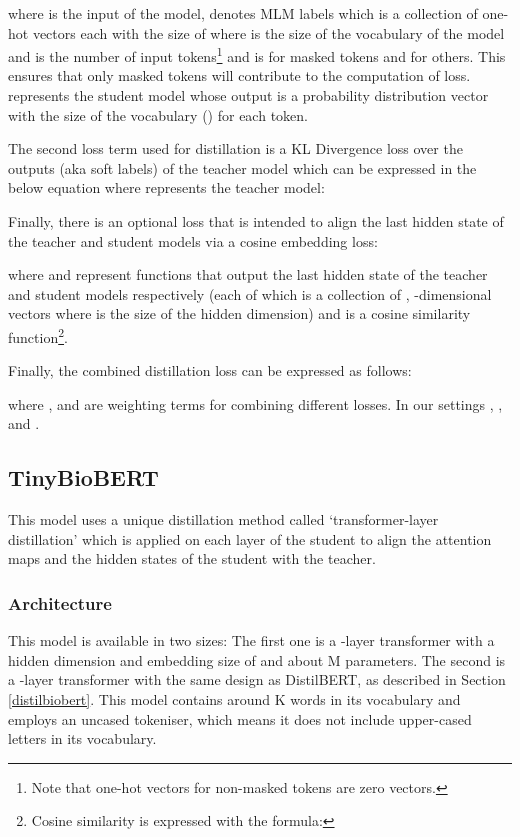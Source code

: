 \documentclass{article}
\begin{document}
where  is the input of the model,  denotes MLM labels which is a collection of  one-hot vectors each with the size of  where  is the size of the vocabulary of the model and  is the number of input tokens\footnote{Note that one-hot vectors for non-masked tokens are zero vectors.} and  is  for masked tokens and  for others. This ensures that only masked tokens will contribute to the computation of loss.  represents the student model whose output is a probability distribution vector with the size of the vocabulary () for each token. 

The second loss term used for distillation is a KL Divergence loss over the outputs (aka soft labels) of the teacher model which can be expressed in the below equation where  represents the teacher model:





Finally, there is an optional loss that is intended to align the last hidden state of the teacher and student models via a cosine embedding loss:


where  and  represent functions that output the last hidden state of the teacher and student models respectively (each of which is a collection of , -dimensional vectors where  is the size of the hidden dimension) and  is a cosine similarity function\footnote{Cosine similarity is expressed with the formula: }.

Finally, the combined distillation loss can be expressed as follows:


where ,  and  are weighting terms for combining different losses. In our settings , , and .

\subsection{TinyBioBERT}
This model uses a unique distillation method called `transformer-layer distillation' which is applied on each layer of the student to align the attention maps and the hidden states of the student with the teacher.

\subsubsection{Architecture}
This model is available in two sizes: The first one is a -layer transformer with a hidden dimension and embedding size of  and about M parameters.
The second is a -layer transformer with the same design as DistilBERT, as  described in Section \ref{distilbiobert}.
This model contains around K words in its vocabulary and employs an uncased tokeniser, which means it does not include upper-cased letters in its vocabulary. 
\end{document}
